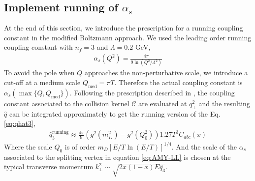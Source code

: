\documentclass[aps, prc, reprint, amsmath, groupedaddress, nofootinbib]{revtex4-1}
\begin{document}
\subsection{Implement running of $\alpha_s$}\label{section:running}
At the end of this section, we introduce the prescription for a running coupling constant in the modified Boltzmann approach.
We used the leading order running coupling constant with $n_f = 3$ and $\Lambda = 0.2$ GeV, 
\begin{eqnarray}
\alpha_s(Q^2) = \frac{4\pi}{9\ln\left(Q^2/\Lambda^2\right)}
\end{eqnarray}
To avoid the pole when $Q$ approaches the non-perturbative scale, we introduce a cut-off at a medium scale $Q_{\textrm{med}} = \pi T$. 
Therefore the actual coupling constant is $\alpha_s(\max\{Q, Q_{\textrm{med}}\})$.
Following the prescription described in \cite{Arnold:2008zu}, the coupling constant associated to the collision kernel $\mathcal{C}$ are evaluated at $q_\perp^2$ and the resulting $\hat{q}$ can be integrated approximately to get the running version of the Eq. \ref{eq:qhat3},
\begin{eqnarray}
\hat{q}_3^{\textrm{running}} \approx \frac{4\pi}{9}\left(g^2(m_D^2) - g^2(Q_0^2)\right) 1.27 T^3 C_{abc}(x)
\label{eq:q3running}
\end{eqnarray}
Where the scale $Q_0$ is of order $m_D [E/T \ln(E/T)]^{1/4}$.
And the scale of the $\alpha_s$ associated to the splitting  vertex in equation \ref{eq:AMY-LL} is chosen at the typical transverse momentum $k_\perp^2 \sim \sqrt{2x(1-x)E\hat{q}_3}$.
\end{document}
